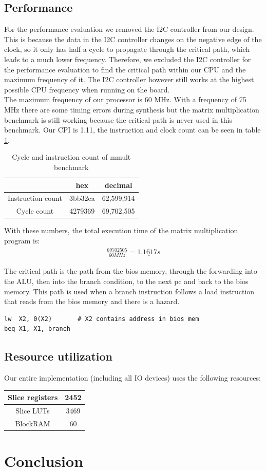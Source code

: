 \documentclass[12pt]{article}
\begin{document}
\subsection{Performance}
For the performance evaluation we removed the I2C controller from our design. This is because the data in the I2C controller changes on the negative edge of the clock, so it only has half a cycle to propagate through the critical path, which leads to a much lower frequency. Therefore, we excluded the I2C controller for the performance evaluation to find the critical path within our CPU and the maximum frequency of it. The I2C controller however still works at the highest possible CPU frequency when running on the board.\\
The maximum frequency of our processor is 60 MHz. With a frequency of 75 MHz there are some timing errors during synthesis but the matrix multiplication benchmark is still working because the critical path is never used in this benchmark. Our CPI is 1.11, the instruction and clock count can be seen in table \ref{tab:performance}.

\begin{table}[!hbtp]
\centering
\begin{tabular}{|c|c|c|}
\hline
& hex & decimal \\
\hline
Instruction count & 3bb32ea & 62,599,914\\
Cycle count & 4279369 & 69,702,505\\
\hline
\end{tabular}
\caption{Cycle and instruction count of mmult benchmark}
\label{tab:performance}
\end{table}

With these numbers, the total execution time of the matrix multiplication program is:
\begin{gather*}
\frac{69702505}{60 MHz} = \underline{\underline{1.1617s}}
\end{gather*}


The critical path is the path from the bios memory, through the forwarding into the ALU, then into the branch condition, to the next pc and back to the bios memory. This path is used when a branch instruction follows a load instruction that reads from the bios memory and there is a hazard.

\begin{lstlisting}
lw  X2, 0(X2)       # X2 contains address in bios mem
beq X1, X1, branch 
\end{lstlisting}

\subsection{Resource utilization}
Our entire implementation (including all IO devices) uses the following resources:
\begin{table}[!h]
\centering
\begin{tabular}{|c|c|}
\hline
Slice registers & 2452 \\
\hline 
Slice LUTs & 3469 \\ 
\hline
BlockRAM & 60 \\
\hline
\end{tabular}
\end{table}

\section{Conclusion}
\end{document}
